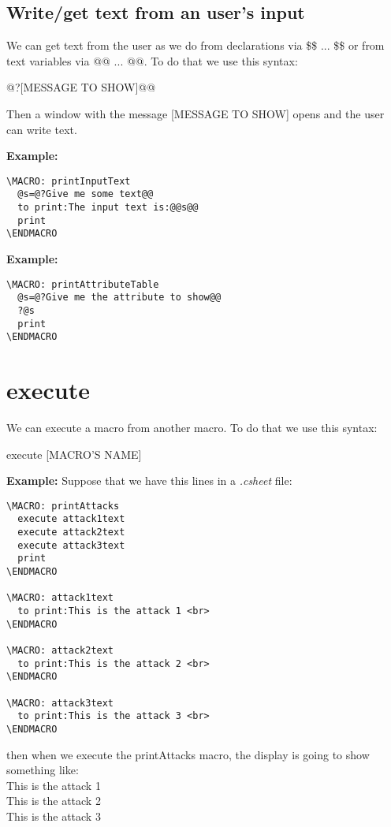 \documentclass[11pt,a4paper,openright,oneside]{book}
\newenvironment{ex}
{
  \setlength{\parindent}{0cm}
  \large \textbf{Example:} \normalsize 
}
{}
\begin{document}
\subsection{Write/get text from an user's input}

We can get text from the user as we do from declarations via \textsf{\$\$ ... \$\$} or from text variables via \textsf{@@ ... @@}. To do that we use this syntax:
\begin{center} \textsf{@?\textsc{\scriptsize[MESSAGE TO SHOW]}@@} \end{center}

Then a window with the message \textsc{\scriptsize[MESSAGE TO SHOW]} opens and the user can write text.

\begin{ex}
  \begin{lstlisting}
\MACRO: printInputText
  @s=@?Give me some text@@
  to print:The input text is:@@s@@
  print
\ENDMACRO
  \end{lstlisting} 
\end{ex}
\begin{ex}
  \begin{lstlisting}
\MACRO: printAttributeTable
  @s=@?Give me the attribute to show@@
  ?@s
  print
\ENDMACRO
  \end{lstlisting} 
\end{ex}

\section{\textsf{execute}}

We can execute a macro from another macro. To do that we use this syntax:
\begin{center} \textsf{execute \textsc{\scriptsize[MACRO'S NAME]}} \end{center}

\begin{ex} Suppose that we have this lines in a \textit{.csheet} file:
  \begin{lstlisting}
\MACRO: printAttacks
  execute attack1text
  execute attack2text
  execute attack3text
  print
\ENDMACRO

\MACRO: attack1text
  to print:This is the attack 1 <br>
\ENDMACRO

\MACRO: attack2text
  to print:This is the attack 2 <br>
\ENDMACRO

\MACRO: attack3text
  to print:This is the attack 3 <br>
\ENDMACRO
  \end{lstlisting}
then when we execute the \textsf{printAttacks} macro, the display is going to show something like: \vspace{5px} \\
\textsf{This is the attack 1 \\
This is the attack 2 \\
This is the attack 3 \\}
\end{ex}
\end{document}
